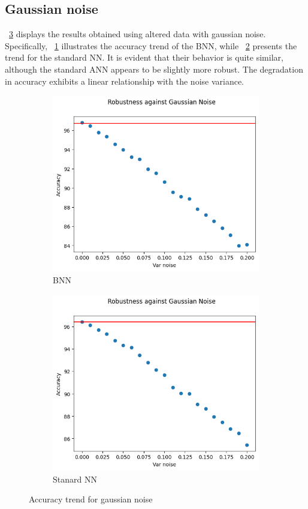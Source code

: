 \subsection{Gaussian noise}

\Fig~\ref{fig:acc_gn_wu} displays the results obtained using altered data with gaussian noise. Specifically, \Fig~\ref{fig:gn_acc_wu_bnn} illustrates the accuracy trend of the BNN, while \Fig~\ref{fig:gaus_noise_ann} presents the trend for the standard NN. It is evident that their behavior is quite similar, although the standard ANN appears to be slightly more robust. The degradation in accuracy exhibits a linear relationship with the noise variance.

\begin{figure}[h]
	\centering
	\begin{subfigure}{.5\textwidth}
		\centering
		\includegraphics[width=0.9\linewidth]{ImageFiles/EvalBNN/GN/WU/acc}
		\caption{BNN}
		\label{fig:gn_acc_wu_bnn}
	\end{subfigure}%
	\begin{subfigure}{.5\textwidth}
		\centering
		\includegraphics[width=0.9\linewidth]{ImageFiles/EvalANN/gaus_noise_ann}
		\caption{Stanard NN}
		\label{fig:gaus_noise_ann}
	\end{subfigure}
	\caption{Accuracy trend for gaussian noise}
	\label{fig:acc_gn_wu}
\end{figure}

